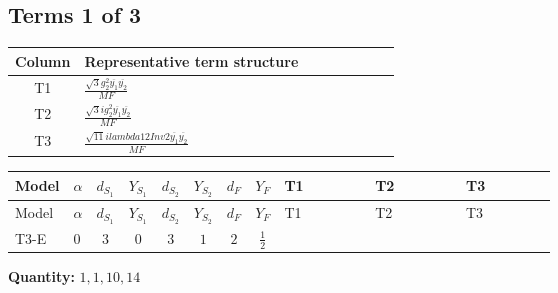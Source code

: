\documentclass[8pt]{article}
\begin{document}
\begin{landscape}
\subsection*{Terms 1 of 3}
\begin{center}
\begin{tabular}{@{}c >{\raggedright\arraybackslash}p{0.82\linewidth}@{}}
\toprule
Column & Representative term structure \\
\midrule
T1 & \(\displaystyle \frac{\sqrt{3} g_{2}^{2} \overline{y_{1}} \overline{y_{2}}}{MF}\) \\
\midrule
T2 & \(\displaystyle \frac{\sqrt{3} i g_{2}^{2} \overline{y_{1}} \overline{y_{2}}}{MF}\) \\
\midrule
T3 & \(\displaystyle \frac{\sqrt{11} i lambda12Inv2 \overline{y_{1}} \overline{y_{2}}}{MF}\) \\
\midrule
\bottomrule
\end{tabular}
\end{center}
\smallskip
\tiny
\begin{longtable}{@{}llcccccc >{\raggedright\arraybackslash}p{0.21\linewidth} >{\raggedright\arraybackslash}p{0.21\linewidth} >{\raggedright\arraybackslash}p{0.21\linewidth}@{}}
\toprule
Model & $\alpha$ & $d_{S_1}$ & $Y_{S_1}$ & $d_{S_2}$ & $Y_{S_2}$ & $d_F$ & $Y_F$ & T1 & T2 & T3 \\
\midrule
\endfirsthead
\toprule
Model & $\alpha$ & $d_{S_1}$ & $Y_{S_1}$ & $d_{S_2}$ & $Y_{S_2}$ & $d_F$ & $Y_F$ & T1 & T2 & T3 \\
\midrule
\endhead
T3-E & $0$ & $3$ & $0$ & $3$ & $1$ & $2$ & $\frac{1}{2}$ & \scriptsize\adjustbox{max width=\linewidth}{$\begin{gathered} - \frac{\sqrt{3} g_{2}^{2} \overline{y_{1}} \overline{y_{2}}}{6 MF}\end{gathered}$} & \scriptsize\adjustbox{max width=\linewidth}{$\begin{gathered} - \frac{49 \sqrt{3} i g_{2}^{2} \overline{y_{1}} \overline{y_{2}}}{24 MF}\end{gathered}$} & \scriptsize\adjustbox{max width=\linewidth}{$\begin{gathered} - \frac{3 \sqrt{11} i lambda12Inv2 \overline{y_{1}} \overline{y_{2}}}{22 MF}\end{gathered}$} \\
\midrule
\bottomrule
\end{longtable}
\clearpage
\noindent\textbf{Quantity: }$\mathrm{1,1,10,14}$\par\smallskip

\end{landscape}
\end{document}

